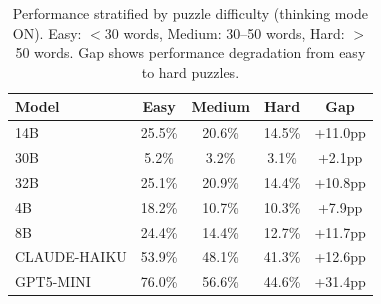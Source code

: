 \begin{table}[t]
\centering
\small
\caption{Performance stratified by puzzle difficulty (thinking mode ON). Easy: $<$30 words, Medium: 30--50 words, Hard: $>$50 words. Gap shows performance degradation from easy to hard puzzles.}
\label{tab:difficulty_stratification}
\begin{tabular}{lcccc}
\toprule
\textbf{Model} & \textbf{Easy} & \textbf{Medium} & \textbf{Hard} & \textbf{Gap} \\
\midrule
14B & 25.5\% & 20.6\% & 14.5\% & +11.0pp \\
30B & 5.2\% & 3.2\% & 3.1\% & +2.1pp \\
32B & 25.1\% & 20.9\% & 14.4\% & +10.8pp \\
4B  & 18.2\% & 10.7\% & 10.3\% & +7.9pp \\
8B  & 24.4\% & 14.4\% & 12.7\% & +11.7pp \\
CLAUDE-HAIKU & 53.9\% & 48.1\% & 41.3\% & +12.6pp \\
GPT5-MINI & 76.0\% & 56.6\% & 44.6\% & +31.4pp \\
\bottomrule
\end{tabular}
\end{table}




